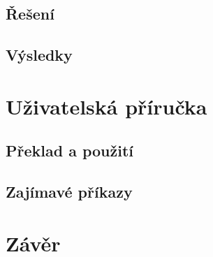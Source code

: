 \documentclass[12pt, a4paper]{report}
\begin{document}
\section{Řešení}

\section{Výsledky}



\chapter{Uživatelská příručka}
\section{Překlad a použití}



\section{Zajímavé příkazy}




\chapter{Závěr}
\end{document}
